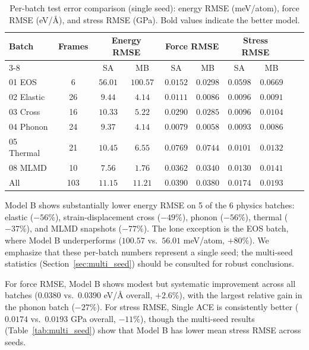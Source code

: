 \documentclass[twoside,prb,aps,floatfix,superscriptaddress,longbibliography]{revtex4-2}
\newcommand{\AAng}{\mbox{\AA}}
\begin{document}
\begin{table}[t]
\caption{Per-batch test error comparison (single seed): energy RMSE (meV/atom), force RMSE (eV/\AAng), and stress RMSE (GPa). Bold values indicate the better model.}
\label{tab:perbatch}
\begin{ruledtabular}
\begin{tabular}{lccccccccc}
\toprule
Batch & \multirow{2}{*}{Frames} & \multicolumn{2}{c}{Energy RMSE} & \multicolumn{2}{c}{Force RMSE} & \multicolumn{2}{c}{Stress RMSE} \\
\cmidrule{3-8}
& & SA & MB & SA & MB & SA & MB \\
\midrule
01 EOS & 6 & $\mathbf{56.01}$ & $100.57$ & $\mathbf{0.0152}$ & $0.0298$ & $\mathbf{0.0598}$ & $0.0669$ \\
02 Elastic & 26 & $9.44$ & $\mathbf{4.14}$ & $0.0111$ & $\mathbf{0.0086}$ & $\mathbf{0.0096}$ & $0.0091$ \\
03 Cross & 16 & $10.33$ & $\mathbf{5.22}$ & $0.0290$ & $\mathbf{0.0285}$ & $\mathbf{0.0096}$ & $0.0104$ \\
04 Phonon & 24 & $9.37$ & $\mathbf{4.14}$ & $0.0079$ & $\mathbf{0.0058}$ & $\mathbf{0.0093}$ & $0.0086$ \\
05 Thermal & 21 & $10.45$ & $\mathbf{6.55}$ & $0.0769$ & $\mathbf{0.0744}$ & $\mathbf{0.0101}$ & $0.0132$ \\
08 MLMD & 10 & $7.56$ & $\mathbf{1.76}$ & $0.0362$ & $\mathbf{0.0340}$ & $\mathbf{0.0130}$ & $0.0141$ \\
\midrule
All & 103 & $\mathbf{11.15}$ & $11.21$ & $0.0390$ & $\mathbf{0.0380}$ & $\mathbf{0.0174}$ & $0.0193$ \\
\bottomrule
\end{tabular}
\end{ruledtabular}
\end{table}

Model B shows substantially lower energy RMSE on 5 of the 6 physics batches: elastic ($-56\%$), strain-displacement cross ($-49\%$), phonon ($-56\%$), thermal ($-37\%$), and MLMD snapshots ($-77\%$). The lone exception is the EOS batch, where Model B underperforms ($100.57$ vs.\ $56.01$ meV/atom, $+80\%$). We emphasize that these per-batch numbers represent a single seed; the multi-seed statistics (Section~\ref{sec:multi_seed}) should be consulted for robust conclusions.

For force RMSE, Model B shows modest but systematic improvement across all batches ($0.0380$ vs.\ $0.0390$ eV/\AAng{} overall, $+2.6\%$), with the largest relative gain in the phonon batch ($-27\%$). For stress RMSE, Single ACE is consistently better ($0.0174$ vs.\ $0.0193$ GPa overall, $-11\%$), though the multi-seed results (Table~\ref{tab:multi_seed}) show that Model B has lower mean stress RMSE across seeds.
\end{document}

